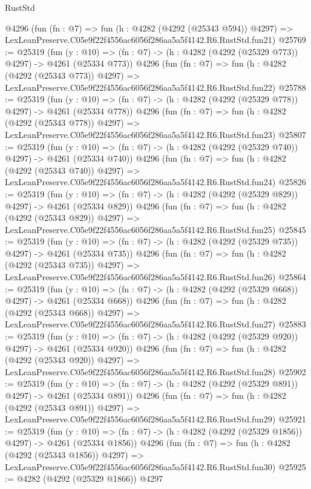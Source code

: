 \begin{lexlean}{RustStd}
\begin{coremodule}
    @4296
    (fun (fn : @7) =>
    fun (h : @4282 (@4292 (@25343 @594)) @4297) =>
    LexLeanPreserve.C05e9f22f4556ac6056f286aa5a5f4142.R6.RustStd.fun21)
@25769 := @25319
    (fun (y : @10) => (fn : @7) -> (h : @4282 (@4292 (@25329 @773)) @4297) -> @4261 (@25334 @773))
    @4296
    (fun (fn : @7) =>
    fun (h : @4282 (@4292 (@25343 @773)) @4297) =>
    LexLeanPreserve.C05e9f22f4556ac6056f286aa5a5f4142.R6.RustStd.fun22)
@25788 := @25319
    (fun (y : @10) => (fn : @7) -> (h : @4282 (@4292 (@25329 @778)) @4297) -> @4261 (@25334 @778))
    @4296
    (fun (fn : @7) =>
    fun (h : @4282 (@4292 (@25343 @778)) @4297) =>
    LexLeanPreserve.C05e9f22f4556ac6056f286aa5a5f4142.R6.RustStd.fun23)
@25807 := @25319
    (fun (y : @10) => (fn : @7) -> (h : @4282 (@4292 (@25329 @740)) @4297) -> @4261 (@25334 @740))
    @4296
    (fun (fn : @7) =>
    fun (h : @4282 (@4292 (@25343 @740)) @4297) =>
    LexLeanPreserve.C05e9f22f4556ac6056f286aa5a5f4142.R6.RustStd.fun24)
@25826 := @25319
    (fun (y : @10) => (fn : @7) -> (h : @4282 (@4292 (@25329 @829)) @4297) -> @4261 (@25334 @829))
    @4296
    (fun (fn : @7) =>
    fun (h : @4282 (@4292 (@25343 @829)) @4297) =>
    LexLeanPreserve.C05e9f22f4556ac6056f286aa5a5f4142.R6.RustStd.fun25)
@25845 := @25319
    (fun (y : @10) => (fn : @7) -> (h : @4282 (@4292 (@25329 @735)) @4297) -> @4261 (@25334 @735))
    @4296
    (fun (fn : @7) =>
    fun (h : @4282 (@4292 (@25343 @735)) @4297) =>
    LexLeanPreserve.C05e9f22f4556ac6056f286aa5a5f4142.R6.RustStd.fun26)
@25864 := @25319
    (fun (y : @10) => (fn : @7) -> (h : @4282 (@4292 (@25329 @668)) @4297) -> @4261 (@25334 @668))
    @4296
    (fun (fn : @7) =>
    fun (h : @4282 (@4292 (@25343 @668)) @4297) =>
    LexLeanPreserve.C05e9f22f4556ac6056f286aa5a5f4142.R6.RustStd.fun27)
@25883 := @25319
    (fun (y : @10) => (fn : @7) -> (h : @4282 (@4292 (@25329 @920)) @4297) -> @4261 (@25334 @920))
    @4296
    (fun (fn : @7) =>
    fun (h : @4282 (@4292 (@25343 @920)) @4297) =>
    LexLeanPreserve.C05e9f22f4556ac6056f286aa5a5f4142.R6.RustStd.fun28)
@25902 := @25319
    (fun (y : @10) => (fn : @7) -> (h : @4282 (@4292 (@25329 @891)) @4297) -> @4261 (@25334 @891))
    @4296
    (fun (fn : @7) =>
    fun (h : @4282 (@4292 (@25343 @891)) @4297) =>
    LexLeanPreserve.C05e9f22f4556ac6056f286aa5a5f4142.R6.RustStd.fun29)
@25921 := @25319
    (fun (y : @10) => (fn : @7) -> (h : @4282 (@4292 (@25329 @1856)) @4297) -> @4261 (@25334 @1856))
    @4296
    (fun (fn : @7) =>
    fun (h : @4282 (@4292 (@25343 @1856)) @4297) =>
    LexLeanPreserve.C05e9f22f4556ac6056f286aa5a5f4142.R6.RustStd.fun30)
@25925 := @4282 (@4292 (@25329 @1866)) @4297

\end{coremodule}
\end{lexlean}
